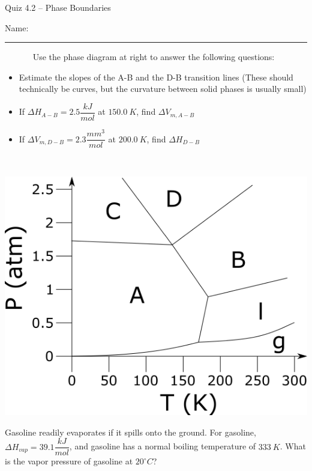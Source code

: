 \documentclass[11pt, letterpaper]{memoir}
\begin{document}
	\begin{center}
		{\large Quiz 4.2 -- Phase Boundaries}
	\end{center}
	{\large Name: \rule[-1mm]{4in}{.1pt} 
		
\noindent\hspace{-2.5em}
\begin{minipage}{0.65\linewidth}
	~ ~ ~ ~ Use the phase diagram at right to answer the following questions:
	
	\noindent
	\begin{itemize}
		\item Estimate the slopes of the A-B and the D-B transition lines (These should technically be curves, but the curvature between solid phases is usually small)
		
		\vspace{3em}
		\item If $\Delta H_{A-B}=2.5\dfrac{kJ}{mol}$ at $150.0~K$, find $\Delta V_{m,A-B}$
		
		\vspace{5em}
		\item If $\Delta V_{m,D-B}=2.3\dfrac{mm^3}{mol}$ at $200.0~K$, find $\Delta H_{D-B}$
	\end{itemize}
\end{minipage}~
\begin{minipage}{0.45\linewidth}
	\includegraphics[width=\textwidth]{Phase_Diagram2}
\end{minipage}

\vspace{5em}\noindent
Gasoline readily evaporates if it spills onto the ground. For gasoline, $\Delta H_{vap}=39.1\dfrac{kJ}{mol}$, and gasoline has a normal boiling temperature of $333~K$. What is the vapor pressure of gasoline at $20^\circ C$?

}
\end{document}
